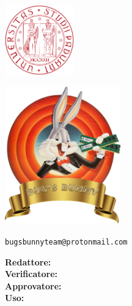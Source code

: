 \begin{titlepage}
    \makeatletter
    
    \begin{minipage}[]{0.3\textwidth}
       	\includegraphics[width=3cm]{assets/unipd}
   	\end{minipage}
    \begin{minipage}[]{0.7\textwidth}
    \end{minipage}
    \begin{center}
        
        \includegraphics[width=5cm]{assets/logo}
        
        \Huge
        \textbf{\teamname}
        
        \vspace{3cm}
        
        \textbf{\@title}

		\vspace{1cm}
		
		\small
		\texttt{bugsbunnyteam@protonmail.com}

        \vspace{1.5cm}
        \Large
        
        \textbf{Redattore:} \redattore \\
        \textbf{Verificatore:} \verificatore \\
        \textbf{Approvatore:} \approvatore \\
        \textbf{Uso:} \uso \\
        
        \vfill
        \makeatother
    \end{center}
\end{titlepage}
